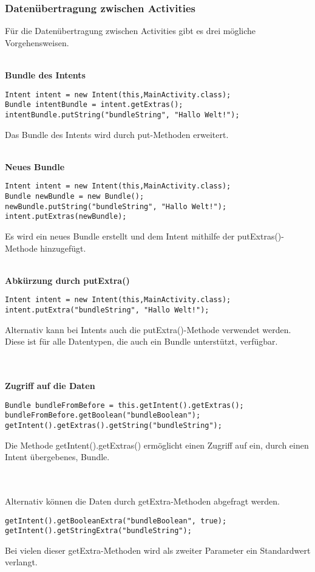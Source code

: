 \documentclass[FIPLY_base.tex]{subfiles}
\begin{document}
\subsubsection{Datenübertragung zwischen Activities}
Für die Datenübertragung zwischen Activities gibt es drei mögliche Vorgehensweisen.

\ \\
\textbf{Bundle des Intents}
\begin{lstlisting}[caption={Übertragung durch das Bundle des Intents},label=DescriptiveLabel]
Intent intent = new Intent(this,MainActivity.class);
Bundle intentBundle = intent.getExtras();
intentBundle.putString("bundleString", "Hallo Welt!");
\end{lstlisting} 
Das Bundle des Intents wird durch put-Methoden erweitert.

\ \\
\textbf{Neues Bundle}
\begin{lstlisting}[caption={Übertragung durch einen Intent mit einem neuen Bundle},label=DescriptiveLabel]
Intent intent = new Intent(this,MainActivity.class);
Bundle newBundle = new Bundle();
newBundle.putString("bundleString", "Hallo Welt!");
intent.putExtras(newBundle);
\end{lstlisting}
Es wird ein neues Bundle erstellt und dem Intent mithilfe der putExtras()-Methode hinzugefügt.

\ \\
\textbf{Abkürzung durch putExtra()}
\begin{lstlisting}[caption={Abkürzung durch die putExtra()-Methode eines Intents},label=DescriptiveLabel]
Intent intent = new Intent(this,MainActivity.class);
intent.putExtra("bundleString", "Hallo Welt!");
\end{lstlisting} 
Alternativ kann bei Intents auch die putExtra()-Methode verwendet werden. Diese ist für alle Datentypen, die auch ein Bundle unterstützt, verfügbar.

\ \\

\ \\
\textbf{Zugriff auf die Daten}
\begin{lstlisting}[caption={Zugriff auf die Daten in der neuen Activity durch die getExtras()-Methode},label=DescriptiveLabel]
Bundle bundleFromBefore = this.getIntent().getExtras();
bundleFromBefore.getBoolean("bundleBoolean");
getIntent().getExtras().getString("bundleString");
\end{lstlisting}
Die Methode getIntent().getExtras() ermöglicht einen Zugriff auf ein, durch einen Intent übergebenes, Bundle.

\ \\
\ \\
Alternativ können die Daten durch getExtra-Methoden abgefragt werden.
\begin{lstlisting}[caption={Zugriff auf die Daten in der neuen Activity durch getExtra()-Methoden},label=DescriptiveLabel]
getIntent().getBooleanExtra("bundleBoolean", true);
getIntent().getStringExtra("bundleString");
\end{lstlisting}
Bei vielen dieser getExtra-Methoden wird als zweiter Parameter ein Standardwert verlangt.
\end{document}
